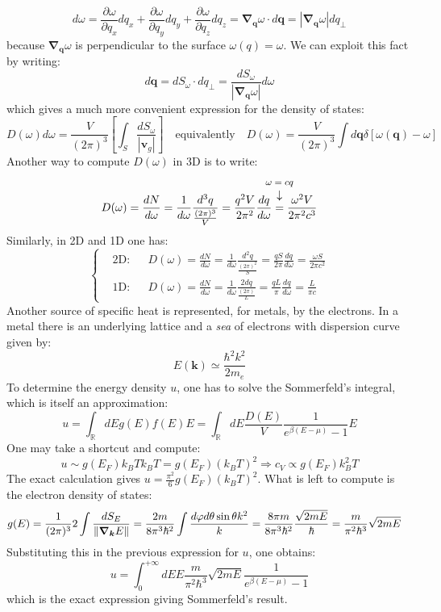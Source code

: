 \documentclass[10.75pt,a4paper,openright,bottom=2cm]{article}
\renewcommand{\Vec}[1]{\boldsymbol{#1}}
\begin{document}
\[
d\omega=\frac{\partial\omega}{\partial q_x}dq_x+\frac{\partial\omega}{\partial q_y}dq_y+\frac{\partial\omega}{\partial q_z}dq_z=\Vec{\nabla}_{\Vec{q}}\omega\cdot d\Vec{q}=|\Vec{\nabla}_{\Vec{q}}\omega|dq_\perp
\]
because $\Vec{\nabla}_{\Vec{q}}\omega$ is perpendicular to the surface $\omega(q)=\omega$. We can exploit this fact by writing: 
\[
d\Vec{q}=dS_\omega\cdot dq_\perp=\frac{dS_\omega}{|\Vec{\nabla}_{\Vec{q}}\omega|}d\omega
\]
which gives a much more convenient expression for the density of states:
\[
D(\omega)d\omega=\frac{V}{(2\pi)^3}\left[\int_S\frac{dS_\omega}{|\Vec{v}_g|}\right] \quad \text{equivalently} \quad D(\omega)=\frac{V}{(2\pi)^3}\int d\Vec{q}\delta[\omega(\Vec{q})-\omega]
\]
Another way to compute $D(\omega)$ in 3D is to write:
\[
D(\omega)=\frac{dN}{d\omega}=\frac{1}{d\omega}\frac{d^3q}{\frac{(2\pi)^3}{V}}=\frac{q^2V}{2\pi^2}\frac{dq}{d\omega}\overset{\mathclap{\tikz \node {$\downarrow$} node [above=1ex] {\footnotesize $\omega=cq$};}}{=}\frac{\omega^2V}{2\pi^2c^3}
\]
Similarly, in 2D and 1D one has:
\[
\left\{
\begin{aligned}
&\text{2D:} &&D(\omega)=\frac{dN}{d\omega}=\frac{1}{d\omega}\frac{d^2q}{\frac{(2\pi)^2}{S}}=\frac{qS}{2\pi}\frac{dq}{d\omega}=\frac{\omega S}{2\pi c^2}\\
&\text{1D:} &&D(\omega)=\frac{dN}{d\omega}=\frac{1}{d\omega}\frac{2dq}{\frac{(2\pi)}{L}}=\frac{qL}{\pi}\frac{dq}{d\omega}=\frac{L}{\pi c}
\end{aligned}
\right.
\]
Another source of specific heat is represented, for metals, by the electrons. In a metal there is an underlying lattice and a \textit{sea} of electrons with dispersion curve given by:
\[
E(\Vec{k})\simeq\frac{\hbar^2k^2}{2m_e}
\]
To determine the energy density $u$, one has to solve the Sommerfeld's integral, which is itself an approximation:
\[
u=\int_\mathbb{R}dEg(E)f(E)E=\int_\mathbb{R}dE\frac{D(E)}{V}\frac{1}{e^{\beta(E-\mu)}-1}E
\]
One may take a shortcut and compute:
\[
u\sim g(E_F)k_BTk_BT=g(E_F)(k_BT)^2\Rightarrow c_V\propto g(E_F)k_B^2T
\]
The exact calculation gives $u=\frac{\pi^2}{6}g(E_F)(k_BT)^2$. What is left to compute is the electron density of states:
\begin{align*}
g(E)&=\frac{1}{(2\pi)^3}2\int\frac{dS_E}{\norm{\Vec{\nabla}_{\Vec{k}}E}}=\frac{2 m}{8\pi^3\hbar^2}\int\frac{d\varphi d\theta\sin\theta k^2}{k}=\frac{8\pi m}{8\pi^3\hbar^2}\frac{\sqrt{2mE}}{\hbar}=\frac{m}{\pi^2\hbar^3}\sqrt{2mE}
\end{align*}
Substituting this in the previous expression for $u$, one obtains:
\[
u=\int_0^{+\infty}dEE\frac{m}{\pi^2\hbar^3}\sqrt{2mE}\frac{1}{e^{\beta(E-\mu)}-1}
\]
which is the exact expression giving Sommerfeld's result.
\newpage
\end{document}
